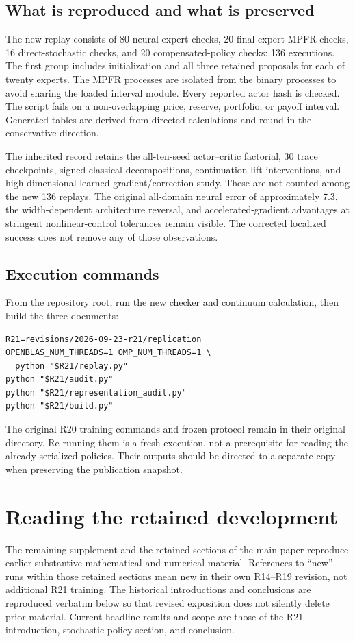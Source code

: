 \subsection{What is reproduced and what is preserved}
The new replay consists of 80 neural expert checks, 20 final-expert MPFR checks, 16 direct-stochastic checks, and 20 compensated-policy checks: 136 executions. The first group includes initialization and all three retained proposals for each of twenty experts. The MPFR processes are isolated from the binary processes to avoid sharing the loaded interval module. Every reported actor hash is checked. The script fails on a non-overlapping price, reserve, portfolio, or payoff interval. Generated tables are derived from directed calculations and round in the conservative direction.

The inherited record retains the all-ten-seed actor--critic factorial, 30 trace checkpoints, signed classical decompositions, continuation-lift interventions, and high-dimensional learned-gradient/correction study. These are not counted among the new 136 replays. The original all-domain neural error of approximately 7.3, the width-dependent architecture reversal, and accelerated-gradient advantages at stringent nonlinear-control tolerances remain visible. The corrected localized success does not remove any of those observations.

\subsection{Execution commands}
From the repository root, run the new checker and continuum calculation, then build the three documents:
\begin{verbatim}
R21=revisions/2026-09-23-r21/replication
OPENBLAS_NUM_THREADS=1 OMP_NUM_THREADS=1 \
  python "$R21/replay.py"
python "$R21/audit.py"
python "$R21/representation_audit.py"
python "$R21/build.py"
\end{verbatim}
The original R20 training commands and frozen protocol remain in their original directory. Re-running them is a fresh execution, not a prerequisite for reading the already serialized policies. Their outputs should be directed to a separate copy when preserving the publication snapshot.

\section{Reading the retained development}
The remaining supplement and the retained sections of the main paper reproduce earlier substantive mathematical and numerical material. References to ``new'' runs within those retained sections mean new in their own R14--R19 revision, not additional R21 training. The historical introductions and conclusions are reproduced verbatim below so that revised exposition does not silently delete prior material. Current headline results and scope are those of the R21 introduction, stochastic-policy section, and conclusion.

